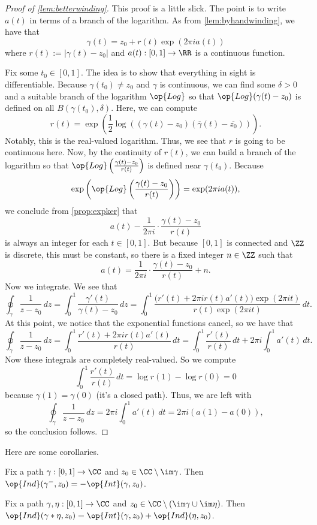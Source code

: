 \begin{proof}[Proof of \autoref{lem:betterwinding}]
	This proof is a little slick. The point is to write $a(t)$ in terms of a branch of the logarithm. As from \autoref{lem:byhandwinding}, we have that
	\[\gamma(t)=z_0+r(t)\exp(2\pi ia(t))\]
	where $r(t):=|\gamma(t)-z_0|$ and $a(t):[0,1]\to\RR$ is a continuous function.

	Fix some $t_0\in[0,1]$. The idea is to show that everything in sight is differentiable. Because $\gamma(t_0)\ne z_0$ and $\gamma$ is continuous, we can find some $\delta>0$ and a suitable branch of the logarithm $\op{Log}$ so that $\op{Log}(\gamma(t)-z_0)$ is defined on all $B(\gamma(t_0),\delta)$. Here, we can compute
	\[r(t)=\exp\left(\frac12\log\left((\gamma(t)-z_0)(\overline\gamma(t)-\overline{z_0})\right)\right).\]
	Notably, this is the real-valued logarithm. Thus, we see that $r$ is going to be continuous here. Now, by the continuity of $r(t)$, we can build a branch of the logarithm so that $\op{Log}\left(\frac{\gamma(t)-z_0}{r(t)}\right)$ is defined near $\gamma(t_0)$. Because
	\[\exp\left(\op{Log}\left(\frac{\gamma(t)-z_0}{r(t)}\right)\right)=\exp(2\pi ia(t)),\]
	we conclude from \autoref{prop:expker} that
	\[a(t)-\frac1{2\pi i}\cdot\frac{\gamma(t)-z_0}{r(t)}\]
	is always an integer for each $t\in[0,1]$. But because $[0,1]$ is connected and $\ZZ$ is discrete, this must be constant, so there is a fixed integer $n\in\ZZ$ such that
	\[a(t)=\frac1{2\pi i}\cdot\frac{\gamma(t)-z_0}{r(t)}+n.\]
	Now we integrate. We see that
	\[\oint_\gamma\frac1{z-z_0}\,dz=\int_0^1\frac{\gamma'(t)}{\gamma(t)-z_0}\,dz=\int_0^1\frac{\big(r'(t)+2\pi ir(t)a'(t)\big)\exp(2\pi it)}{r(t)\exp(2\pi it)}\,dt.\]
	At this point, we notice that the exponential functions cancel, so we have that
	\[\oint_\gamma\frac1{z-z_0}\,dz=\int_0^1\frac{r'(t)+2\pi ir(t)a'(t)}{r(t)}\,dt=\int_0^1\frac{r'(t)}{r(t)}\,dt+2\pi i\int_0^1a'(t)\,dt.\]
	Now these integrals are completely real-valued. So we compute
	\[\int_0^1\frac{r'(t)}{r(t)}\,dt=\log r(1)-\log r(0)=0\]
	because $\gamma(1)=\gamma(0)$ (it's a closed path). Thus, we are left with
	\[\oint_\gamma\frac1{z-z_0}\,dz=2\pi i\int_0^1a'(t)\,dt=2\pi i(a(1)-a(0)),\]
	so the conclusion follows.
\end{proof}
Here are some corollaries.
\begin{corollary}
	Fix a path $\gamma:[0,1]\to\CC$ and $z_0\in\CC\setminus\im\gamma$. Then $\op{Ind}(\gamma^-,z_0)=-\op{Int}(\gamma,z_0)$.
\end{corollary}
\begin{corollary}
	Fix a path $\gamma,\eta:[0,1]\to\CC$ and $z_0\in\CC\setminus(\im\gamma\cup\im\eta)$. Then $\op{Ind}(\gamma*\eta,z_0)=\op{Int}(\gamma,z_0)+\op{Ind}(\eta,z_0)$.
\end{corollary}

